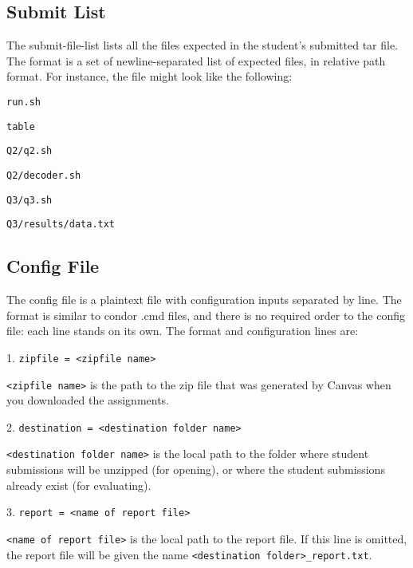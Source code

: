 \documentclass[12pt]{article}
\begin{document}
\subsection{Submit List} \label{sec:submit-list}

The submit-file-list lists all the files expected in the student's submitted tar file. The format is a set of newline-separated list of expected files, in relative path format. For instance, the file might look like the following:

\vspace{5pt}

\texttt{run.sh}

\texttt{table}

\texttt{Q2/q2.sh}

\texttt{Q2/decoder.sh}

\texttt{Q3/q3.sh}

\texttt{Q3/results/data.txt}

\subsection{Config File} \label{sec:config}

The config file is a plaintext file with configuration inputs separated by line. The format is similar to condor .cmd files, and there is no required order to the config file: each line stands on its own. The format and configuration lines are:

\vspace{5pt}

1. \texttt{zipfile = <zipfile name>}

\texttt{<zipfile name>} is the path to the zip file that was generated by Canvas when you downloaded the assignments.

\vspace{5pt}

2. \texttt{destination = <destination folder name>}

\texttt{<destination folder name>} is the local path to the folder where student submissions will be unzipped (for opening), or where the student submissions already exist (for evaluating).

\vspace{5pt}

3. \texttt{report = <name of report file>}

\texttt{<name of report file>} is the local path to the report file. If this line is omitted, the report file will be given the name \texttt{<destination folder>\_report.txt}.
\end{document}
